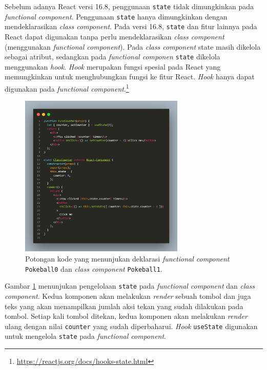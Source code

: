 \documentclass[a4paper,twoside]{article}
\begin{document}
\begin{enumerate}
		Sebelum adanya React versi 16.8, penggunaan \texttt{state} tidak dimungkinkan pada \textit{functional component}. Penggunaan \texttt{state} hanya dimungkinkan dengan mendeklarasikan \textit{class component}. Pada versi 16.8, \texttt{state} dan fitur lainnya pada React dapat digunakan tanpa perlu mendeklarasikan \textit{class component} (menggunakan \textit{functional component}). Pada \textit{class component} state masih dikelola sebagai atribut, sedangkan pada \textit{functional componen} \texttt{state} dikelola menggunakan \textit{hook}. \textit{Hook} merupakan fungsi spesial pada React yang memungkinkan untuk menghubungkan fungsi ke fitur React. \textit{Hook} hanya dapat digunakan pada \textit{functional component}.\footnote{\url{https://reactjs.org/docs/hooks-state.html}}
		
		
		\begin{figure}[H]
            \centering
            \includegraphics[width=0.7\textwidth]{images/code-class-func-state.png}
            \caption{Potongan kode yang menunjukan deklarasi \textit{functional component} \texttt{Pokeball0} dan \textit{class component} \texttt{Pokeball1}.}
            \label{fig:react-code-class-func-state}
        \end{figure}
        
        Gambar \ref{fig:react-code-class-func-state} menunjukan pengelolaan \texttt{state} pada \textit{functional component} dan \textit{class component}. Kedua komponen akan melakukan \textit{render} sebuah tombol dan juga teks yang akan menampilkan jumlah aksi tekan yang sudah dilakukan pada tombol. Setiap kali tombol ditekan, kedua komponen akan melakukan \textit{render} ulang dengan nilai \texttt{counter} yang sudah diperbaharui. \textit{Hook} \texttt{useState} digunakan untuk mengelola \texttt{state} pada \textit{functional component}.
        

\end{enumerate}
\end{document}
